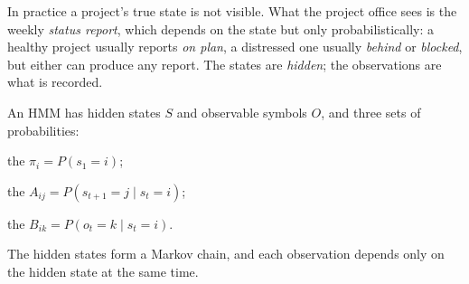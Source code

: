 In practice a project's true state is not visible. What the project office sees is
the weekly \emph{status report}, which depends on the state but only
probabilistically: a healthy project usually reports \emph{on plan}, a distressed
one usually \emph{behind} or \emph{blocked}, but either can produce any report. The
states are \emph{hidden}; the observations are what is recorded.

\begin{definitionbox}
An HMM has hidden states $S$ and observable symbols $O$, and three sets of
probabilities:
\begin{tight}
  \item the  $\pi_i = P(s_1 = i)$;
  \item the  $A_{ij} = P(s_{t+1} = j \mid s_t = i)$;
  \item the  $B_{ik} = P(o_t = k \mid s_t = i)$.
\end{tight}
The hidden states form a Markov chain, and each observation depends only on the
hidden state at the same time.
\end{definitionbox}

